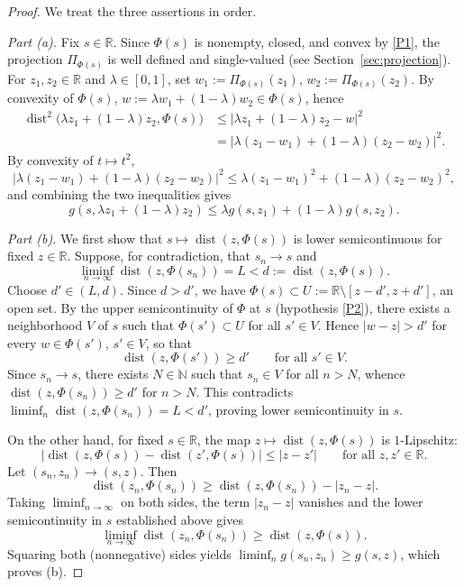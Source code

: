 \documentclass[11pt]{elsarticle}
\theoremstyle{definition}
\theoremstyle{remark}
\numberwithin{equation}{section}
\begin{document}
\begin{proof}
	We treat the three assertions in order.
	
	\emph{Part (a).} Fix $s\in\mathbb{R}$. Since $\Phi(s)$ is nonempty, closed, and convex
	by \ref{P1}, the projection $\Pi_{\Phi(s)}$ is well defined and single-valued (see Section~\ref{sec:projection}). For
	$z_1,z_2\in\mathbb{R}$ and $\lambda\in[0,1]$, set
	$w_1:=\Pi_{\Phi(s)}(z_1)$, $w_2:=\Pi_{\Phi(s)}(z_2)$. By convexity of
	$\Phi(s)$, $w:=\lambda w_1+(1-\lambda)w_2\in\Phi(s)$, hence
	\begin{align*}
	\operatorname{dist}^2\bigl(\lambda z_1+(1-\lambda)z_2,\Phi(s)\bigr)
	& \le |\lambda z_1+(1-\lambda)z_2-w|^2
	\\
	& = |\lambda(z_1-w_1)+(1-\lambda)(z_2-w_2)|^2.
	\end{align*}
	By convexity of $t\mapsto t^2$,
	\[
	|\lambda(z_1-w_1)+(1-\lambda)(z_2-w_2)|^2
	\le \lambda(z_1-w_1)^2+(1-\lambda)(z_2-w_2)^2,
	\]
	and combining the two inequalities gives
	\[
	g(s,\lambda z_1+(1-\lambda)z_2)\le \lambda g(s,z_1)+(1-\lambda)g(s,z_2).
	\]
	
	\emph{Part (b).} We first show that $s\mapsto\operatorname{dist}(z,\Phi(s))$
	is lower semicontinuous for fixed $z\in\mathbb{R}$. Suppose, for contradiction,
	that $s_n\to s$ and
	\[
	\liminf_{n\to\infty}\operatorname{dist}(z,\Phi(s_n)) = L < d:=\operatorname{dist}(z,\Phi(s)).
	\]
	Choose $d'\in(L,d)$. Since $d>d'$, we have $\Phi(s)\subset U:=\mathbb{R}\setminus[z-d',z+d']$,
	an open set. By the upper semicontinuity of $\Phi$ at $s$ (hypothesis \ref{P2}),
	there exists a neighborhood $V$ of $s$ such that $\Phi(s')\subset U$ for all
	$s'\in V$. Hence $|w-z|>d'$ for every $w\in\Phi(s')$, $s'\in V$, so that
	\[
	\operatorname{dist}(z,\Phi(s'))\ge d' \qquad \text{for all } s'\in V.
	\]
	Since $s_n\to s$, there exists $N\in\mathbb{N}$ such that $s_n\in V$ for all
	$n>N$, whence $\operatorname{dist}(z,\Phi(s_n))\ge d'$ for $n>N$. This contradicts
	$\liminf_n \operatorname{dist}(z,\Phi(s_n)) = L < d'$, proving lower semicontinuity
	in $s$.
	
	On the other hand, for fixed $s\in\mathbb{R}$, the map
	$z\mapsto\operatorname{dist}(z,\Phi(s))$ is $1$-Lipschitz:
	\[
	\bigl|\operatorname{dist}(z,\Phi(s))-\operatorname{dist}(z',\Phi(s))\bigr|
	\le |z-z'| \qquad \text{for all } z,z'\in\mathbb{R}.
	\]
	Let $(s_n,z_n)\to(s,z)$. Then
	\[
	\operatorname{dist}(z_n,\Phi(s_n)) \ge \operatorname{dist}(z,\Phi(s_n)) - |z_n-z|.
	\]
	Taking $\liminf_{n\to\infty}$ on both sides, the term $|z_n-z|$ vanishes and
	the lower semicontinuity in $s$ established above gives
	\[
	\liminf_{n\to\infty}\operatorname{dist}(z_n,\Phi(s_n)) \ge \operatorname{dist}(z,\Phi(s)).
	\]
	Squaring both (nonnegative) sides yields $\liminf_n g(s_n,z_n)\ge g(s,z)$,
	which proves (b).
	

\end{proof}
\end{document}
